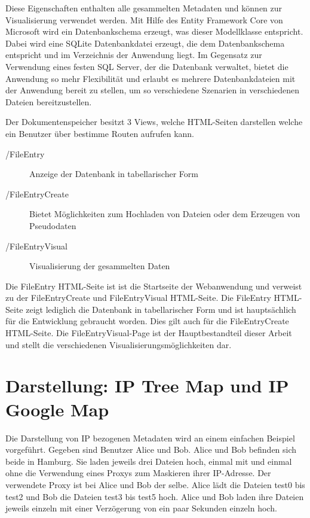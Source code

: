 \documentclass[
    fontsize=12pt,
    headings=small,
    parskip=half,           %
    bibliography=totoc,
    numbers=noenddot,       %
    open=any,               %
    ]{scrreprt}
\begin{document}
Diese Eigenschaften enthalten alle gesammelten Metadaten und können zur Visualisierung verwendet werden. 
Mit Hilfe des Entity Framework Core von Microsoft wird ein Datenbankschema erzeugt, was dieser Modellklasse entspricht. 
Dabei wird eine SQLite Datenbankdatei erzeugt, die dem Datenbankschema entspricht und im Verzeichnis der Anwendung liegt.
Im Gegensatz zur Verwendung eines festen SQL Server, der die Datenbank verwaltet, bietet die Anwendung so mehr Flexibilität und erlaubt es mehrere Datenbankdateien mit der Anwendung bereit zu stellen, um so verschiedene Szenarien in verschiedenen Dateien bereitzustellen.

Der Dokumentenspeicher besitzt 3 Views, welche HTML-Seiten darstellen welche ein Benutzer über bestimme Routen aufrufen kann. 

\begin{description}
\item[/FileEntry] Anzeige der Datenbank in tabellarischer Form
\item[/FileEntryCreate] Bietet Möglichkeiten zum Hochladen von Dateien oder dem Erzeugen von Pseudodaten
\item[/FileEntryVisual] Visualisierung der gesammelten Daten
\end{description}

Die FileEntry HTML-Seite ist ist die Startseite der Webanwendung und verweist zu der FileEntryCreate und FileEntryVisual HTML-Seite.
Die FileEntry HTML-Seite zeigt lediglich die Datenbank in tabellarischer Form und ist hauptsächlich für die Entwicklung gebraucht worden. 
Dies gilt auch für die FileEntryCreate HTML-Seite. 
Die FileEntryVisual-Page ist der Hauptbestandteil dieser Arbeit und stellt die verschiedenen Visualisierungsmöglichkeiten dar. 

\newpage
\section{Darstellung: IP Tree Map und IP Google Map}
Die Darstellung von IP bezogenen Metadaten wird an einem einfachen Beispiel vorgeführt.
Gegeben sind Benutzer Alice und Bob.
Alice und Bob befinden sich beide in Hamburg.
Sie laden jeweils drei Dateien hoch, einmal mit und einmal ohne die Verwendung eines Proxys zum Maskieren ihrer IP-Adresse.
Der verwendete Proxy ist bei Alice und Bob der selbe.
Alice lädt die Dateien test0 bis test2 und Bob die Dateien test3 bis test5 hoch.
Alice und Bob laden ihre Dateien jeweils einzeln mit einer Verzögerung von ein paar Sekunden einzeln hoch.
\end{document}
